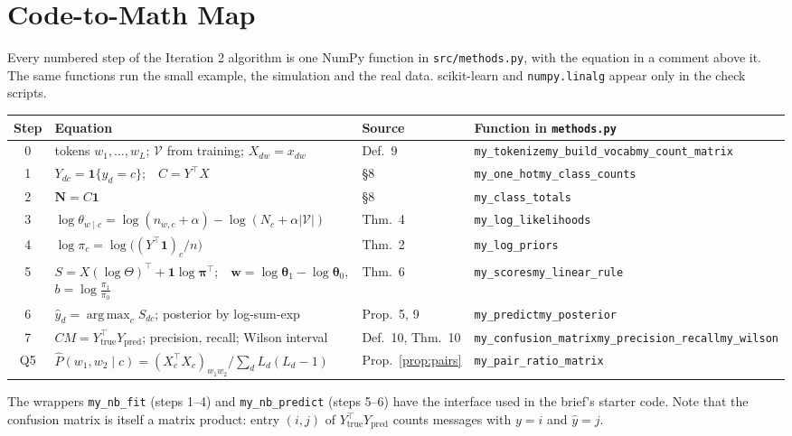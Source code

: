 \documentclass[11pt]{article}
\theoremstyle{plain}
\newcommand{\V}{\mathcal{V}}
\newcommand{\Vs}{|\mathcal{V}|}
\newcommand{\bw}{\mathbf{w}}
\DeclareMathOperator*{\argmax}{arg\,max}
\begin{document}
\section{Code-to-Math Map}\label{sec:map}
Every numbered step of the Iteration 2 algorithm is one NumPy function in \texttt{src/methods.py},
with the equation in a comment above it. The same functions run the small example, the simulation
and the real data. scikit-learn and \texttt{numpy.linalg} appear only in the check scripts.

\begin{center}
\small
\begin{tabularx}{\textwidth}{@{}c>{\raggedright\arraybackslash}X l>{\raggedright\arraybackslash}p{4.3cm}@{}}
\toprule
Step & Equation & Source & Function in \texttt{methods.py}\\
\midrule
0 & tokens $w_1,\dots,w_L$; $\V$ from training; $X_{dw}=x_{dw}$ & Def.~9 & \texttt{my\_tokenize}\newline\texttt{my\_build\_vocab}\newline\texttt{my\_count\_matrix}\\
1 & $Y_{dc}=\mathbf 1\{y_d=c\}$;\ \ $C=Y^\top X$ & \S8 & \texttt{my\_one\_hot}\newline\texttt{my\_class\_counts}\\
2 & $\mathbf N=C\mathbf 1$ & \S8 & \texttt{my\_class\_totals}\\
3 & $\log\theta_{w\mid c}=\log(n_{w,c}+\alpha)-\log(N_c+\alpha\Vs)$ & Thm.~4 & \texttt{my\_log\_likelihoods}\\
4 & $\log\pi_c=\log\big((Y^\top\mathbf 1)_c/n\big)$ & Thm.~2 & \texttt{my\_log\_priors}\\
5 & $S=X(\log\Theta)^\top+\mathbf 1\log\boldsymbol\pi^\top$;\ \ $\bw=\log\boldsymbol\theta_1-\log\boldsymbol\theta_0$, $b=\log\frac{\pi_1}{\pi_0}$ & Thm.~6 & \texttt{my\_scores}\newline\texttt{my\_linear\_rule}\\
6 & $\hat y_d=\argmax_cS_{dc}$; posterior by log-sum-exp & Prop.~5, 9 & \texttt{my\_predict}\newline\texttt{my\_posterior}\\
7 & $CM=Y_{\text{true}}^\top Y_{\text{pred}}$; precision, recall; Wilson interval & Def.~10, Thm.~10 & \texttt{my\_confusion\_matrix}\newline\texttt{my\_precision\_recall}\newline\texttt{my\_wilson}\\
Q5 & $\hat P(w_1,w_2\mid c)=(X_c^\top X_c)_{w_1w_2}\big/\sum_dL_d(L_d-1)$ & Prop.~\ref{prop:pairs} & \texttt{my\_pair\_ratio\_matrix}\\
\bottomrule
\end{tabularx}
\end{center}
The wrappers \texttt{my\_nb\_fit} (steps 1--4) and \texttt{my\_nb\_predict} (steps 5--6) have the
interface used in the brief's starter code. Note that the confusion matrix is itself a matrix
product: entry $(i,j)$ of $Y_{\text{true}}^\top Y_{\text{pred}}$ counts messages with $y=i$ and $\hat y=j$.
\end{document}
